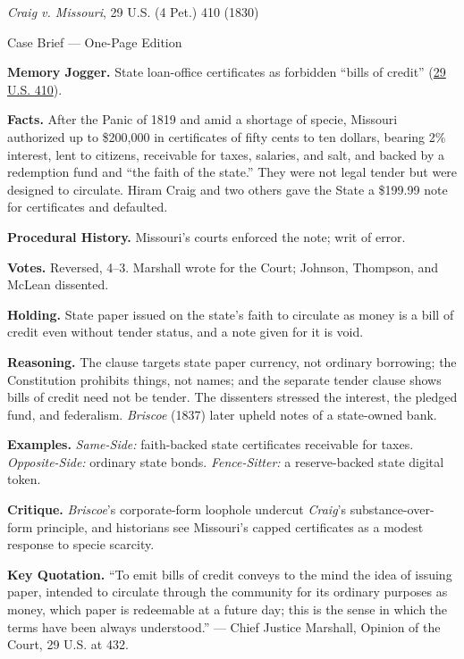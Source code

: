 \documentclass[12pt]{article}
\begin{document}
\begin{center}
{\Large \textit{Craig v. Missouri}, 29 U.S. (4 Pet.) 410 (1830)\par}
\vspace{0.3em}
{\normalsize Case Brief --- One-Page Edition\par}
\end{center}

\textbf{Memory Jogger.} State loan-office certificates as forbidden ``bills of credit'' (\href{https://supreme.justia.com/cases/federal/us/29/410/}{29 U.S. 410}).

\textbf{Facts.} After the Panic of 1819 and amid a shortage of specie, Missouri authorized up to \$200,000 in certificates of fifty cents to ten dollars, bearing 2\% interest, lent to citizens, receivable for taxes, salaries, and salt, and backed by a redemption fund and ``the faith of the state.'' They were not legal tender but were designed to circulate. Hiram Craig and two others gave the State a \$199.99 note for certificates and defaulted.

\textbf{Procedural History.} Missouri's courts enforced the note; writ of error.

\textbf{Votes.} Reversed, 4--3. Marshall wrote for the Court; Johnson, Thompson, and McLean dissented.

\textbf{Holding.} State paper issued on the state's faith to circulate as money is a bill of credit even without tender status, and a note given for it is void.

\textbf{Reasoning.} The clause targets state paper currency, not ordinary borrowing; the Constitution prohibits things, not names; and the separate tender clause shows bills of credit need not be tender. The dissenters stressed the interest, the pledged fund, and federalism. \textit{Briscoe} (1837) later upheld notes of a state-owned bank.

\textbf{Examples.} \emph{Same-Side:} faith-backed state certificates receivable for taxes. \emph{Opposite-Side:} ordinary state bonds. \emph{Fence-Sitter:} a reserve-backed state digital token.

\textbf{Critique.} \textit{Briscoe}'s corporate-form loophole undercut \textit{Craig}'s substance-over-form principle, and historians see Missouri's capped certificates as a modest response to specie scarcity.

\textbf{Key Quotation.} ``To emit bills of credit conveys to the mind the idea of issuing paper, intended to circulate through the community for its ordinary purposes as money, which paper is redeemable at a future day; this is the sense in which the terms have been always understood.'' --- Chief Justice Marshall, Opinion of the Court, 29 U.S. at 432.
\end{document}
